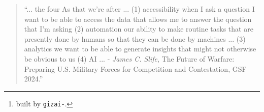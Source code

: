 \begin{quote}
\enquote{... the four As that we're after ... (1) accessibility when I ask a question I want to be able to access the data that allows me to answer the question that I'm asking (2) automation our ability to make routine tasks that are presently done by humans so that they can be done by machines ... (3) analytics we want to be able to generate insights that might not otherwise be obvious to us (4) AI ... - \emph{James C. Slife}, The Future of Warfare: Preparing U.S. Military Forces for Competition and Contestation, GSF 2024.}
\end{quote}


\begin{abstract}
First, we develop a mathematical model to discuss the four As in Section~\ref{theory}. Then, we propose expansions for Access and Automation in Sections~\ref{access} and \ref{automation}, respectively. We briefly review a proposed view of Analytics as Access to the outputs of Automation in Section~\ref{analytics}. Finally, in Section~\ref{ai}, we review a reference implementation of the proposed framework~\cite{abcli} based on \emph{Bash}~\cite{gnu_bash} expansions that call into \emph{Python}~\cite{python} in multiple AI applications~\footnote{built by \texttt{gizai-\revision}.}.
\end{abstract}



